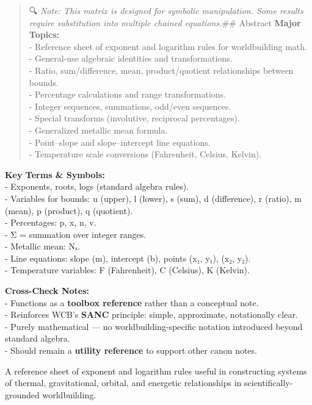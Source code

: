 \documentclass[
  letterpaper,
]{book}
\begin{document}
\begin{quote}
🔍 \emph{Note: This matrix is designed for symbolic manipulation. Some
results require substitution into multiple chained equations.}\#\#
Abstract \textbf{Major Topics:}\\
- Reference sheet of exponent and logarithm rules for worldbuilding
math.\\
- General-use algebraic identities and transformations.\\
- Ratio, sum/difference, mean, product/quotient relationships between
bounds.\\
- Percentage calculations and range transformations.\\
- Integer sequences, summations, odd/even sequences.\\
- Special transforms (involutive, reciprocal percentages).\\
- Generalized metallic mean formula.\\
- Point--slope and slope--intercept line equations.\\
- Temperature scale conversions (Fahrenheit, Celsius, Kelvin).
\end{quote}

\textbf{Key Terms \& Symbols:}\\
- Exponents, roots, logs (standard algebra rules).\\
- Variables for bounds: u (upper), l (lower), s (sum), d (difference), r
(ratio), m (mean), p (product), q (quotient).\\
- Percentages: p, x, n, v.\\
- Σ = summation over integer ranges.\\
- Metallic mean: Nₓ.\\
- Line equations: slope (m), intercept (b), points (x₁, y₁), (x₂, y₂).\\
- Temperature variables: F (Fahrenheit), C (Celsius), K (Kelvin).

\textbf{Cross-Check Notes:}\\
- Functions as a \textbf{toolbox reference} rather than a conceptual
note.\\
- Reinforces WCB's \textbf{SANC} principle: simple, approximate,
notationally clear.\\
- Purely mathematical --- no worldbuilding-specific notation introduced
beyond standard algebra.\\
- Should remain a \textbf{utility reference} to support other canon
notes.

A reference sheet of exponent and logarithm rules useful in constructing
systems of thermal, gravitational, orbital, and energetic relationships
in scientifically-grounded worldbuilding.
\end{document}
